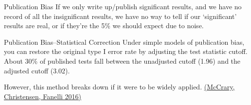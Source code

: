 \documentclass{beamer}
\begin{document}
\begin{frame}{Publication Bias}
If we only write up/publish significant results, and we have no record of all the insignificant results, we have no way to tell if our `significant' results are real, or if they're the 5\% we should expect due to noise.
\end{frame}

\begin{frame}{Publication Bias--Statistical Correction}
Under simple models of publication bias, you can restore the original type I error rate by adjusting the test statistic cutoff. About 30\% of published tests fall between the unadjusted cutoff (1.96) and the adjusted cutoff (3.02). 

\vspace{0.25in}
However, this method breaks down if it were to be widely applied. \href{http://journals.plos.org/plosone/article?id=10.1371/journal.pone.0149590}{(McCrary, Christensen, Fanelli 2016)}
\end{frame}
{ %
    \begin{frame}[plain]
     \end{frame}
}

\end{document}
